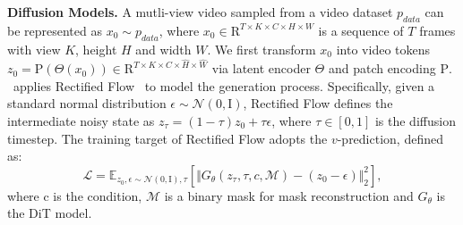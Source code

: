 \noindent\textbf{Diffusion Models.}
A mutli-view video sampled from a video dataset $p_{data}$ can be represented as $x_0 \sim p_{data}$, where $x_0 \in \mathrm{R}^{T\times K \times C \times H \times W}$ is a sequence of $T$ frames with view $K$, height $H$ and width $W$. We first transform $x_0$ into video tokens $z_0 = \mathrm{P}(\Theta(x_0)) \in \mathrm{R}^{T\times K \times C \times \hat{H} \times \hat{W}}$ via latent encoder $\Theta$ and patch encoding $\mathrm{P}$. \ourmethod\ applies Rectified Flow~\cite{sd3,liu2022flow,lipman2022flow} to model the generation process. Specifically, given a standard normal distribution $\epsilon \sim \mathcal{N}(0, \mathrm{I})$, Rectified Flow defines the intermediate noisy state as $z_\tau = (1-\tau)z_0 + \tau\epsilon$, where $\tau\in[0,1]$ is the diffusion timestep. The training target of Rectified Flow 
adopts the $v$-prediction, 
defined as: 
\begin{equation}
    \mathcal{L} = 
    \mathbb{E}_{{z_0},\epsilon\sim{\mathcal{N}(0, \mathrm{I})},\tau}\left[ \Vert
    G_\theta(z_\tau,\tau,c,\mathcal{M}) - (z_0-\epsilon)
    \Vert^2_2 \right],
\label{eq:loss}
\end{equation}
where c is the condition, $\mathcal{M}$ is a binary mask for mask reconstruction and $G_\theta$ is the DiT model. 

